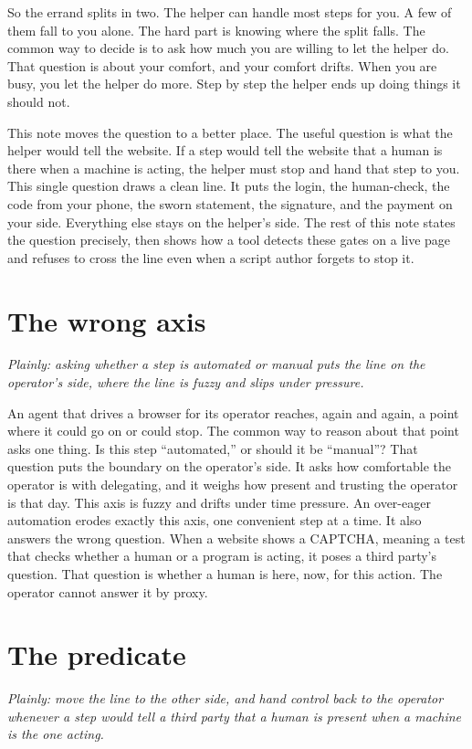 \documentclass[11pt]{article}
\begin{document}
So the errand splits in two. The helper can handle most steps for you. A few of them fall to you alone. The hard part is knowing where the split falls. The common way to decide is to ask how much you are willing to let the helper do. That question is about your comfort, and your comfort drifts. When you are busy, you let the helper do more. Step by step the helper ends up doing things it should not.

This note moves the question to a better place. The useful question is what the helper would tell the website. If a step would tell the website that a human is there when a machine is acting, the helper must stop and hand that step to you. This single question draws a clean line. It puts the login, the human-check, the code from your phone, the sworn statement, the signature, and the payment on your side. Everything else stays on the helper's side. The rest of this note states the question precisely, then shows how a tool detects these gates on a live page and refuses to cross the line even when a script author forgets to stop it.

\section{The wrong axis}
\emph{Plainly: asking whether a step is automated or manual puts the line on the operator's side, where the line is fuzzy and slips under pressure.}

An agent that drives a browser for its operator reaches, again and again, a point where it could go on or could stop. The common way to reason about that point asks one thing. Is this step ``automated,'' or should it be ``manual''? That question puts the boundary on the operator's side. It asks how comfortable the operator is with delegating, and it weighs how present and trusting the operator is that day. This axis is fuzzy and drifts under time pressure. An over-eager automation erodes exactly this axis, one convenient step at a time. It also answers the wrong question. When a website shows a CAPTCHA, meaning a test that checks whether a human or a program is acting, it poses a third party's question. That question is whether a human is here, now, for this action. The operator cannot answer it by proxy.

\section{The predicate}
\emph{Plainly: move the line to the other side, and hand control back to the operator whenever a step would tell a third party that a human is present when a machine is the one acting.}
\end{document}
